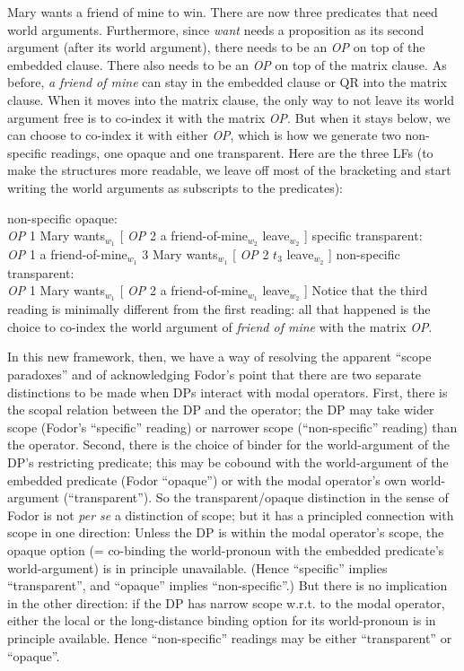 \ex \label{fom} Mary wants a friend of mine to win. \xe
%
There are now three predicates that need world arguments. Furthermore, since
\emph{want} needs a proposition as its second argument (after its world
argument), there needs to be an \emph{OP} on top of the embedded clause. There
also needs to be an \emph{OP} on top of the matrix clause. As before, \emph{a
  friend of mine} can stay in the embedded clause or QR into the matrix clause.
When it moves into the matrix clause, the only way to not leave its world
argument free is to co-index it with the matrix \emph{OP}. But when it stays
below, we can choose to co-index it with either \emph{OP}, which is how we
generate two non-specific readings, one opaque and one transparent. Here are the
three LFs (to make the structures more readable, we leave off most of the
bracketing and start writing the world arguments as subscripts to the
predicates):

\pex
\a non-specific opaque:\\
\emph{OP} 1 Mary wants$_{w_1}$ [ \emph{OP} 2 a friend-of-mine$_{w_2}$
leave$_{w_2}$ ]
\a specific transparent:\\
\emph{OP} 1 a friend-of-mine$_{w_1}$ 3 Mary wants$_{w_1}$ [ \emph{OP} 2 $t_3$
leave$_{w_2}$ ]
\a non-specific transparent:\\
\emph{OP} 1 Mary wants$_{w_1}$ [ \emph{OP} 2 a friend-of-mine$_{w_1}$
leave$_{w_2}$ ] \xe
%
Notice that the third reading is minimally different from the first reading: all
that happened is the choice to co-index the world argument of \emph{friend of
  mine} with the matrix \emph{OP}.

In this new framework, then, we have a way of resolving the apparent ``scope
paradoxes'' and of acknowledging Fodor's point that there are two separate
distinctions to be made when DPs interact with modal operators. First, there is
the scopal relation between the DP and the operator; the DP may take wider scope
(Fodor's ``specific'' reading) or narrower scope (``non-specific'' reading) than
the operator. Second, there is the choice of binder for the world-argument of
the DP's restricting predicate; this may be cobound with the world-argument of
the embedded predicate (Fodor ``opaque'') or with the modal operator's own
world-argument (``transparent''). So the transparent/opaque distinction in the
sense of Fodor is not \emph{per se} a distinction of scope; but it has a
principled connection with scope in one direction: Unless the DP is within the
modal operator's scope, the opaque option (= co-binding the world-pronoun with
the embedded predicate's world-argument) is in principle unavailable. (Hence
``specific'' implies ``transparent'', and ``opaque'' implies ``non-specific''.)
But there is no implication in the other direction: if the DP has narrow scope
w.r.t. to the modal operator, either the local or the long-distance binding
option for its world-pronoun is in principle available. Hence ``non-specific''
readings may be either ``transparent'' or ``opaque''.

